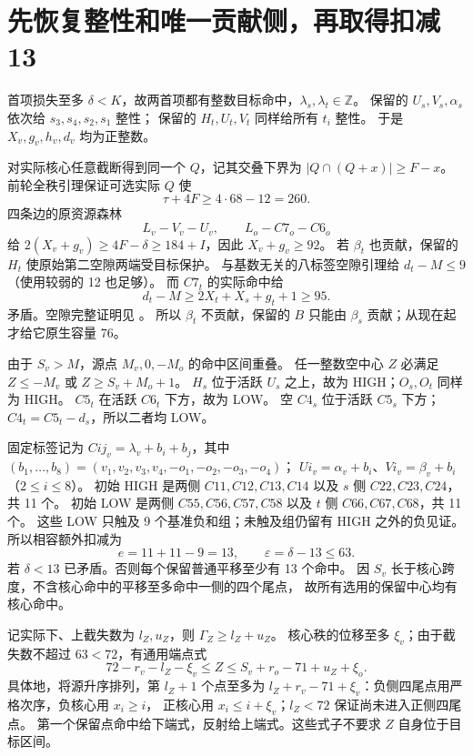 \documentclass[11pt,a4paper]{article}
\newcommand{\Z}{\mathbb Z}
\newcommand{\eps}{\varepsilon}
\begin{document}
\section{先恢复整性和唯一贡献侧，再取得扣减 13}
首项损失至多 $\delta<K$，故两首项都有整数目标命中，$\lambda_s,\lambda_t\in\Z$。
保留的 $U_s,V_s,\alpha_s$ 依次给 $s_3,s_4,s_2,s_1$ 整性；
保留的 $H_t,U_t,V_t$ 同样给所有 $t_i$ 整性。
于是 $X_v,g_v,h_v,d_v$ 均为正整数。

对实际核心任意截断得到同一个 $Q$，记其交叠下界为
$|Q\cap(Q+x)|\ge F-x$。前轮全秩引理保证可选实际 $Q$ 使
\begin{equation}\label{eq:F}
\tau+4F\ge4\cdot68-12=260.
\end{equation}
四条边的原资源森林
\[L_v-V_v-U_v,\qquad L_o-C7_o-C6_o\]
给 $2(X_v+g_v)\ge4F-\delta\ge184+I$，因此 $X_v+g_v\ge92$。
若 $\beta_t$ 也贡献，保留的 $H_t$ 使原始第二空隙两端受目标保护。
与基数无关的八标签空隙引理给 $d_t-M\le9$（使用较弱的 12 也足够）。
而 $C7_t$ 的实际命中给
\[d_t-M\ge2X_t+X_s+g_t+1\ge95.\]
矛盾。空隙完整证明见
。
所以 $\beta_t$ 不贡献，保留的 $B$ 只能由 $\beta_s$ 贡献；从现在起才给它原生容量 76。

由于 $S_v>M$，源点 $M_v,0,-M_o$ 的命中区间重叠。
任一整数空中心 $Z$ 必满足 $Z\le-M_v$ 或 $Z\ge S_v+M_o+1$。
$H_s$ 位于活跃 $U_s$ 之上，故为 HIGH；$O_s,O_t$ 同样为 HIGH。
$C5_t$ 在活跃 $C6_t$ 下方，故为 LOW。
空 $C4_s$ 位于活跃 $C5_s$ 下方；$C4_t=C5_t-d_s$，所以二者均 LOW。

固定标签记为 $Cij_v=\lambda_v+b_i+b_j$，其中
$(b_1,\ldots,b_8)=(v_1,v_2,v_3,v_4,-o_1,-o_2,-o_3,-o_4)$；
$Ui_v=\alpha_v+b_i$、$Vi_v=\beta_v+b_i$（$2\le i\le8$）。
初始 HIGH 是两侧 $C11,C12,C13,C14$ 以及 $s$ 侧 $C22,C23,C24$，共 11 个。
初始 LOW 是两侧 $C55,C56,C57,C58$ 以及 $t$ 侧 $C66,C67,C68$，共 11 个。
这些 LOW 只触及 9 个基准负和组；未触及组仍留有 HIGH 之外的负见证。
所以相容额外扣减为
\[e=11+11-9=13,\qquad\eps=\delta-13\le63.\]
若 $\delta<13$ 已矛盾。否则每个保留普通平移至少有 13 个命中。
因 $S_v$ 长于核心跨度，不含核心命中的平移至多命中一侧的四个尾点，
故所有选用的保留中心均有核心命中。

记实际下、上截失数为 $l_Z,u_Z$，则 $\Gamma_Z\ge l_Z+u_Z$。
核心秩的位移至多 $\xi_v$；由于截失数不超过 $63<72$，有通用端点式
\begin{equation}\label{eq:end}
72-r_v-l_Z-\xi_v\le Z\le S_v+r_o-71+u_Z+\xi_o.
\end{equation}
具体地，将源升序排列，第 $l_Z+1$ 个点至多为
$l_Z+r_v-71+\xi_v$：负侧四尾点用严格次序，负核心用 $x_i\ge i$，
正核心用 $x_i\le i+\xi_v$；$l_Z<72$ 保证尚未进入正侧四尾点。
第一个保留点命中给下端式，反射给上端式。这些式子不要求 $Z$ 自身位于目标区间。
\end{document}

